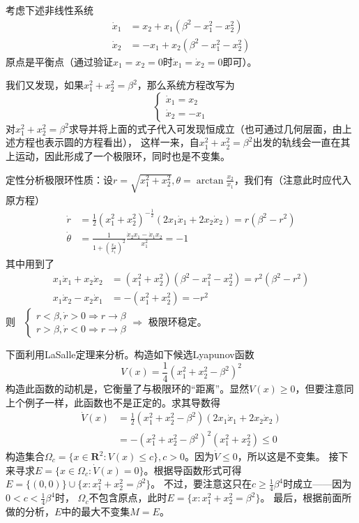 \begin{example}[收敛至极限环]
	考虑下述非线性系统\begin{align*}
		\dot{x}_1&=x_2+x_1(\beta^2-x_1^2-x_2^2)\\
		\dot{x}_2&=-x_1+x_2(\beta^2-x_1^2-x_2^2)
	\end{align*}
	原点是平衡点（通过验证$x_1=x_2=0$时$\dot{x}_1=\dot{x}_2=0$即可）。

	我们又发现，如果$x_1^2+x_2^2=\beta^2$，那么系统方程改写为\[\left\{\begin{array}{l}
    \dot{x}_1 = x_2\\
    \dot{x}_2 = - x_1
  \end{array}\right.\]
  对$x_1^2+x_2^2=\beta^2$求导并将上面的式子代入可发现恒成立（也可通过几何层面，由上述方程也表示圆的方程看出），
  这样一来，自$x_1^2+x_2^2=\beta^2$出发的轨线会一直在其上运动，因此形成了一个极限环，同时也是不变集。

  \begin{note}
    定性分析极限环性质：设$r = \sqrt{x^2_1 + x^2_2}, \theta = \arctan \frac{x_2}{x_1}$，我们有（注意此时应代入原方程）
  \begin{align*}
    \dot{r}& = \frac{1}{2}(x_{1}^{2}+x_{2}^{2})^{-\frac{1}{2}}(2x_{1}\dot{x}_{1}+2x_{2}\dot{x}_{2})= r (\beta^2 - r^2)\\
    \dot{\theta} & =\frac{1}{1+(\frac{x_{2}}{x_{1}})^{2}}\frac{\dot{x}_{2}x_{1}-\dot{x}_{1}x_{2}}{x_{1}^{2}}= - 1
  \end{align*}
  其中用到了
  \begin{align*}
    x_1\dot{x}_1+x_2\dot{x}_2& = (x_1^2+x_2^2)(\beta^2-x_1^2-x_2^2)= r^2 (\beta^2 - r^2)\\
    x_1\dot{x}_2-x_2\dot{x}_1 & = -(x_1^2+x_2^2)=- r^2
  \end{align*}
  则 \ $\left\{\begin{array}{l}
    r < \beta, \dot{r} > 0 \Rightarrow r \rightarrow \beta\\
    r > \beta, \dot{r} < 0 \Rightarrow r \rightarrow \beta
  \end{array}\right. \Rightarrow$ 极限环稳定。
\end{note}

  下面利用LaSalle定理来分析。构造如下候选Lyapunov函数\[ V (x) = \frac{1}{4} (x^2_1 + x^2_2 - \beta^2)^2 \]
  构造此函数的动机是，它衡量了与极限环的“距离”。显然$V (x) \geq 0$，但要注意同上个例子一样，此函数也不是正定的。求其导数得
  \begin{align*}
    \dot{V} (x) & =  \frac{1}{2} (x^2_1 + x^2_2 - \beta^2) (2 x_1 \dot{x}_1 +
    2 x_2 \dot{x}_2)\\
    & =  - (x^2_1 + x^2_2 - \beta^2)^2 (x^2_1 + x^2_2)\leq 0
  \end{align*}
  构造集合$\Omega_c =
  \{ x \in \mathbf{R}^2 : V (x) \leq c \},c > 0$。因为$\dot{V} \leq 0$，所以这是不变集。
  接下来寻求$E = \{ x \in \Omega_c : \dot{V} (x) = 0 \}$。根据导函数形式可得$E = \{
  (0, 0) \} \cup \{ x : x^2_1 + x^2_2 = \beta^2 \}$。
  不过，要注意这只在$c \ge \frac{1}{4} \beta^4$时成立——因为$0 < c < \frac{1}{4} \beta^4$时，
  $\Omega_c $不包含原点，此时$E=\{ x : x^2_1 + x^2_2 = \beta^2 \}$。
  最后，根据前面所做的分析，$E$中的最大不变集$M = E$。
  

\end{example}
